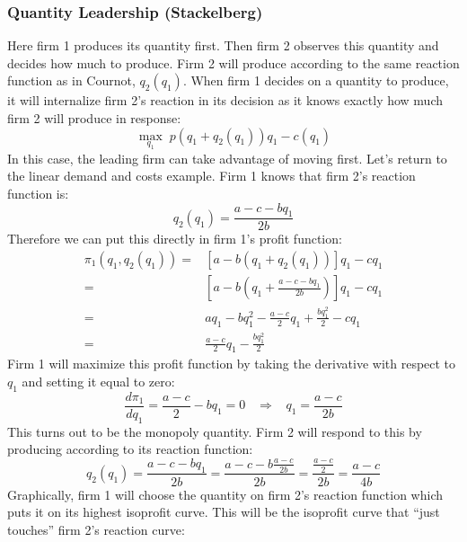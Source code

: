 \documentclass{article}
\begin{document}
\subsubsection*{Quantity Leadership (Stackelberg)}
Here firm 1 produces its quantity first. Then firm 2 observes this quantity and
decides how much to produce. Firm 2 will produce according to the same reaction
function as in Cournot, $q_2\left( q_1 \right)$. When firm 1 decides on a
quantity to produce, it will internalize firm 2's reaction in its decision as it knows exactly how much firm 2 will produce in response:
\[
  \underset{q_1}{\max}\; p\left( q_1+q_2\left( q_1 \right) \right)q_1 - c\left(
  q_1 \right)
\]
In this case, the leading firm can take advantage of moving first. Let's return to the linear demand and costs example. Firm 1 knows that firm 2's reaction function is:
\[q_2\left( q_1 \right)= \frac{a-c-bq_1}{2b}\]
Therefore we can put this directly in firm 1's profit function:
\begin{align*}
  \pi_1\left( q_1,q_2\left( q_1 \right) \right)=&\left[ a-b\left( q_1+q_2\left( q_1 \right) \right) \right]q_1 - cq_1\\
  =&\left[ a-b\left( q_1+\frac{a-c-bq_1}{2b} \right) \right]q_1 - cq_1\\
  =& aq_1 -bq_1^2 -\frac{a-c}{2}q_1+\frac{bq_1^2}{2} - cq_1\\
  =& \frac{a-c}{2}q_1-\frac{bq_1^2}{2}
\end{align*}
Firm 1 will maximize this profit function by taking the derivative with respect to $q_1$ and setting it equal to zero:
\[
  \frac{d\pi_1}{dq_1}=\frac{a-c}{2}-bq_1 = 0 \;\;\;\Longrightarrow \;\;\;
  q_1=\frac{a-c}{2b}
\]
This turns out to be the monopoly quantity. Firm 2 will respond to this by producing according to its reaction function:
\[
  q_2\left( q_1 \right)= \frac{a-c-bq_1}{2b} = \frac{a-c-b\frac{a-c}{2b}}{2b}=\frac{\frac{a-c}{2}}{2b}=\frac{a-c}{4b}
\]
Graphically, firm 1 will choose the quantity on firm 2's reaction function
which puts it on its highest isoprofit curve. This will be the isoprofit curve that ``just touches'' firm 2's reaction curve:
\begin{center}
\end{center}
\end{document}
